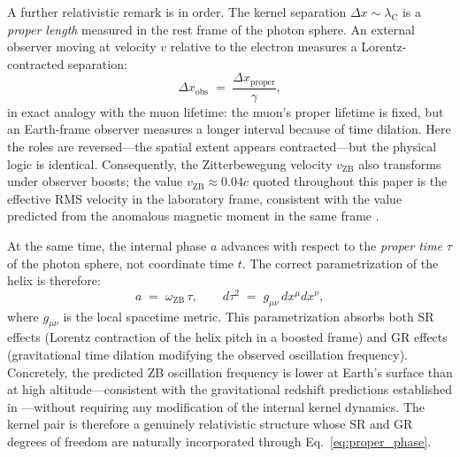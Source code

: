 \documentclass[%
 reprint, amsmath,amssymb, aps, prb, ]{revtex4-2}
\numberwithin{equation}{section}
\newcommand{\omZB}{\omega_{\text{ZB}}}
\newcommand{\lambdaC}{\lambda_{\mathrm{C}}}
\begin{document}
A further relativistic remark is in order. The kernel separation $\Delta x \sim \lambdaC$ is a \emph{proper length} measured in the rest frame of the photon sphere. An external observer moving at velocity $v$ relative to the electron measures a Lorentz-contracted separation:
\begin{equation}
\Delta x_{\text{obs}} \;=\; \frac{\Delta x_{\text{proper}}}{\gamma},
\label{eq:lorentz_separation}
\end{equation}
in exact analogy with the muon lifetime: the muon's proper lifetime is fixed, but an Earth-frame observer measures a longer interval because of time dilation. Here the roles are reversed---the spatial extent appears contracted---but the physical logic is identical. Consequently, the Zitterbewegung velocity $v_\mathrm{ZB}$ also transforms under observer boosts; the value $v_\mathrm{ZB} \approx 0.04c$ quoted throughout this paper is the effective RMS velocity in the laboratory frame, consistent with the value predicted from the anomalous magnetic moment in the same frame \cite{hanamura10, hanamura36}.

At the same time, the internal phase $a$ advances with respect to the \emph{proper time} $\tau$ of the photon sphere, not coordinate time $t$. The correct parametrization of the helix is therefore:
\begin{equation}
a \;=\; \omZB\,\tau, \qquad d\tau^2 \;=\; g_{\mu\nu}\,dx^\mu dx^\nu,
\label{eq:proper_phase}
\end{equation}
where $g_{\mu\nu}$ is the local spacetime metric. This parametrization absorbs both SR effects (Lorentz contraction of the helix pitch in a boosted frame) and GR effects (gravitational time dilation modifying the observed oscillation frequency). Concretely, the predicted ZB oscillation frequency is lower at Earth's surface than at high altitude---consistent with the gravitational redshift predictions established in \cite{hanamura22}---without requiring any modification of the internal kernel dynamics. The kernel pair is therefore a genuinely relativistic structure whose SR and GR degrees of freedom are naturally incorporated through Eq.~\eqref{eq:proper_phase}.
\end{document}
